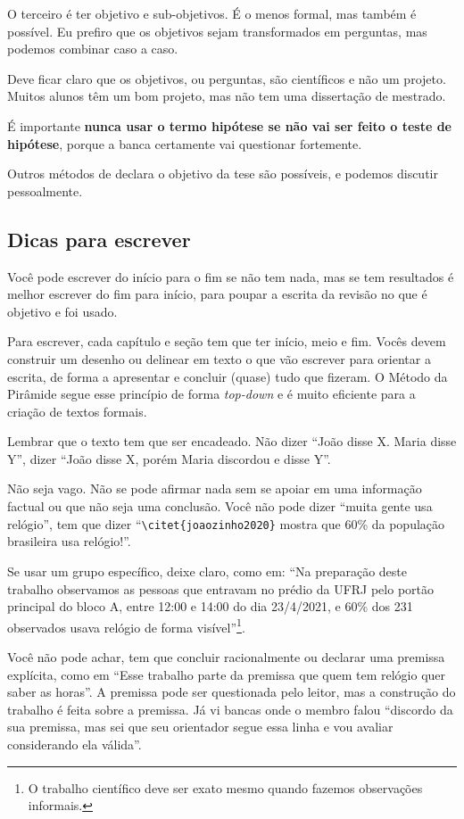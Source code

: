 \documentclass{article}
\begin{document}
\begin{outline}
O terceiro é ter objetivo e sub-objetivos. É o menos formal, mas também é possível. Eu prefiro que os objetivos sejam transformados em perguntas, mas podemos combinar caso a caso.

Deve ficar claro que os objetivos, ou perguntas, são científicos e não um projeto. Muitos alunos têm um bom projeto, mas não tem uma dissertação de mestrado.

É importante \textbf{nunca usar o termo hipótese se não vai ser feito o teste de hipótese}, porque a banca certamente vai questionar fortemente.

Outros métodos de declara o objetivo da tese são possíveis, e podemos discutir pessoalmente.


\subsection{Dicas para escrever}
    
Você pode escrever do início para o fim se não tem nada, mas se tem resultados é melhor escrever do fim para início, para poupar a escrita da revisão no que é objetivo e foi usado.

Para escrever, cada capítulo e seção tem que ter início, meio e fim. Vocês devem construir um desenho ou delinear em texto o que vão escrever para orientar a escrita, de forma a apresentar e concluir (quase) tudo que fizeram. 
O Método da Pirâmide\citep{minto1,minto2} segue esse princípio de forma \textit{top-down} e é muito eficiente para a criação de textos formais.

Lembrar que o texto tem que ser encadeado. Não dizer ``João disse X. Maria disse Y'', dizer ``João disse X, porém Maria discordou e disse Y''.

Não seja vago. Não se pode afirmar nada sem se apoiar em uma informação factual ou que não seja uma conclusão. Você não pode dizer ``muita gente usa relógio'', tem que dizer ``\verb!\citet{joaozinho2020}! mostra que 60\% da população brasileira usa relógio!''.

Se usar um grupo específico, deixe claro, como em: ``Na preparação deste trabalho observamos as pessoas que entravam no prédio da UFRJ pelo portão principal do bloco A, entre 12:00 e 14:00 do dia 23/4/2021, e 60\% dos 231 observados usava relógio de forma visível''\footnote{O trabalho científico deve ser exato mesmo quando fazemos observações informais.}.

Você não pode achar, tem que concluir racionalmente ou declarar uma premissa explícita, como em ``Esse trabalho parte da premissa que quem tem relógio quer saber as horas''. A premissa pode ser questionada pelo leitor, mas a construção do trabalho é feita sobre a premissa. Já vi bancas onde o membro falou ``discordo da sua premissa, mas sei que seu orientador segue essa linha e vou avaliar considerando ela válida''.


\end{outline}
\end{document}
